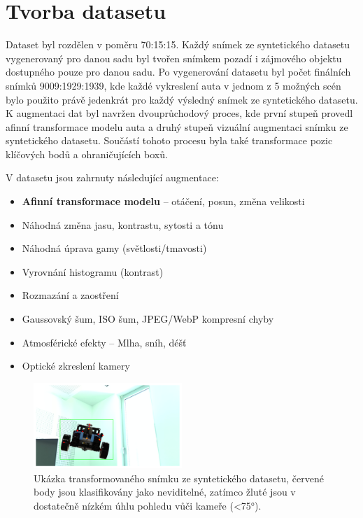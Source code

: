 \section{Tvorba datasetu}
\label{sec:Chapter41}

Dataset byl rozdělen v poměru 70:15:15. Každý snímek ze syntetického datasetu vygenerovaný pro danou sadu byl tvořen snímkem pozadí i zájmového objektu dostupného pouze pro danou sadu. Po vygenerování datasetu byl počet finálních snímků 9009:1929:1939, kde každé vykreslení auta v jednom z 5 možných scén bylo použito právě jedenkrát pro každý výsledný snímek ze syntetického datasetu. K augmentaci dat byl navržen dvouprůchodový proces, kde první stupeň provedl afinní transformace modelu auta a druhý stupeň vizuální augmentaci snímku ze syntetického datasetu. Součástí tohoto procesu byla také transformace pozic klíčových bodů a ohraničujících boxů.

V datasetu jsou zahrnuty následující augmentace:
\begin{itemize}
\item \textbf{Afinní transformace modelu} -- otáčení, posun, změna velikosti
\item Náhodná změna jasu, kontrastu, sytosti a tónu
\item Náhodná úprava gamy (světlosti/tmavosti)
\item Vyrovnání histogramu (kontrast)
\item Rozmazání a zaostření
\item Gaussovský šum, ISO šum, JPEG/WebP kompresní chyby
\item Atmosférické efekty -- Mlha, sníh, déšť
\item Optické zkreslení kamery
\end{itemize}


\begin{figure}[ht]
\centering
\includegraphics[width=0.5\textwidth,keepaspectratio]{Figures/dataset_ex.png}
\caption[Ukázka transformovaného snímku ze syntetického datasetu]{Ukázka transformovaného snímku ze syntetického datasetu, červené body jsou klasifikovány jako neviditelné, zatímco žluté jsou v dostatečně nízkém úhlu pohledu vůči kameře (<75°).}
\label{fig:datasetimg}
\end{figure}